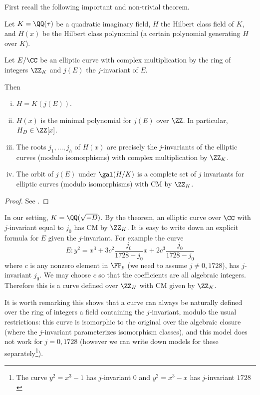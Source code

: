 \documentclass[11pt]{article}
\begin{document}
\begin{description}
	First recall the following important and non-trivial theorem.
	\begin{thm}
		Let $K=\QQ(\tau)$ be a quadratic imaginary field, $H$ the Hilbert class field of $K$, and $H(x)$ be the Hilbert class polynomial (a certain polynomial generating $H$ over $K$).
		
		Let $E/\CC$ be an elliptic curve with complex multiplication by the ring of integers $\ZZ_K$ and $j(E)$ the $j$-invariant of $E$.
		
		Then
		\begin{enumerate}[(i)]
			\item $H = K(j(E))$.
			\item $H(x)$ is the minimal polynomial for $j(E)$ over $\ZZ$. In particular, $H_D\in \ZZ[x]$.
			\item The roots $j_1,\dots,j_h$ of $H(x)$ are precisely the $j$-invariants of the elliptic curves (modulo isomorphisms) with complex multiplication by $\ZZ_K$.
			\item The orbit of $j(E)$ under $\gal(H/K)$ is a complete set of $j$ invariants for elliptic curves (modulo isomorphisms) with CM by $\ZZ_K$.
		\end{enumerate}
	\end{thm}
	\begin{proof}
		See \cite[Thm.~II.4.1, Pg.~121]{silverman1994advanced}.
	\end{proof}
	
	In our setting, $K = \QQ(\sqrt{-D})$. By the theorem, an elliptic curve over $\CC$ with $j$-invariant equal to $j_0$ has CM by $\ZZ_K$. It is easy to write down an explicit formula for $E$ given the $j$-invariant. For example the curve
	$$
	E:  y^2 = x^3 + 3c^2\frac{j_0}{1728 - j_0}x + 2c^3\frac{j_0}{1728 - j_0}
	$$
	where $c$ is any nonzero element in $\FF_p$ (we need to assume $j\neq 0,1728$), has $j$-invariant $j_0$. We may choose $c$ so that the coefficients are all algebraic integers. Therefore this is a curve defined over $\ZZ_H$ with CM given by $\ZZ_K$.
	
	\begin{rem}
		It is worth remarking this shows that a curve can always be naturally defined over the ring of integers a field containing the $j$-invariant, modulo the usual restrictions: this curve is isomorphic to the original over the algebraic closure (where the $j$-invariant parameterizes isomorphism classes), and this model does not work for $j=0,1728$ (however we can write down models for these separately\footnote{The curve $y^2 = x^3 - 1$ has $j$-invariant $0$ and $y^2 = x^3 - x$ has $j$-invariant $1728$}).
	\end{rem}
	

\end{description}
\end{document}
